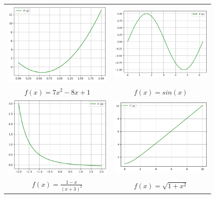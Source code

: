         \begin{figure}[h!]
            \begin{tabular}{cc}
            \includegraphics[width=75mm]{Figures/del1_2a_1.png} &   \includegraphics[width=75mm]{Figures/del1_2a_2.png} \\
            $f(x)=7x^{2}-8x+1$ & $f(x)=sin(x)$ \\[6pt]
            \includegraphics[width=75mm]{Figures/del1_2a_3.png} &   \includegraphics[width=75mm]{Figures/del1_2a_4.png} \\
            $f(x)=\frac{1-x}{(x+3)^{2}}$ & $f(x)=\sqrt{1+x^{2}}$ \\[6pt]
            \end{tabular}
        \end{figure}
        \newpage
